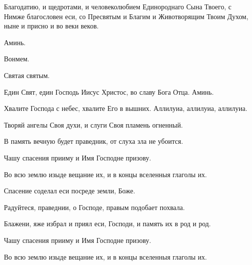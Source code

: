 \begin{mymulticols}
 Благодатию, и щедротами, и человеколюбием Единороднаго Сына Твоего, с Нимже благословен еси, со Пресвятым и Благим и Животворящим Твоим Духом, ныне и присно и во веки веков. 

 Аминь.


 Вонмем. 


 Святая святым. 

 Един Свят, един Господь Иисус Христос, во славу Бога Отца. Аминь. 






 Хвалите Господа с небес, хвалите Его в вышних. Аллилуиа, аллилуиа, аллилуиа. 

 Творяй ангелы Своя духи, и слуги Своя пламень огненный. 

 В память вечную будет праведник, от слуха зла не убоится. 

 Чашу спасения прииму и Имя Господне призову. 

 Во всю землю изыде вещание их, и в концы вселенныя глаголы их. 

 Спасение соделал еси посреде земли, Боже. 

 Радуйтеся, праведнии, о Господе, правым подобает похвала. 

 Блажени, яже избрал и приял еси, Господи, и память их в род и род. 

 Чашу спасения прииму и Имя Господне призову. 

 Во всю землю изыде вещание их, и в концы вселенныя глаголы их. 


\end{mymulticols}
